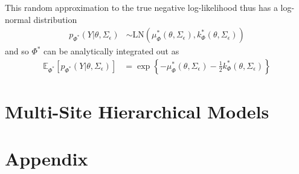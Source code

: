\documentclass[12pt]{article}
\newcommand{\E}{\mathbb{E}}
\begin{document}
This random approximation to the true negative log-likelihood thus has a log-normal distribution 
\begin{align}
p_{\Phi^*}(Y|\theta, \Sigma_\epsilon) &\sim \text{LN}\left(\mu^*_\Phi(\theta, \Sigma_\epsilon), k^*_\Phi(\theta, \Sigma_\epsilon) \right)
\end{align}
and so $\Phi^*$ can be analytically integrated out as
\begin{align}
\E_{\Phi^*}\left[p_{\Phi^*}(Y|\theta, \Sigma_\epsilon) \right] &= \exp\left\{-\mu^*_\Phi(\theta, \Sigma_\epsilon) - \frac{1}{2}k^*_\Phi(\theta, \Sigma_\epsilon) \right\}
\end{align}

\section{Multi-Site Hierarchical Models}

\section{Appendix}
\end{document}
